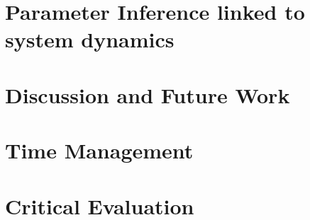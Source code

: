 \documentclass[12pt,a4paper,titlepage]{article}
\begin{document}





\section{Parameter Inference linked to system dynamics}

\section{Discussion and Future Work}

\newpage

\appendix
\section{Time Management}
\section{Critical Evaluation}
\end{document}
